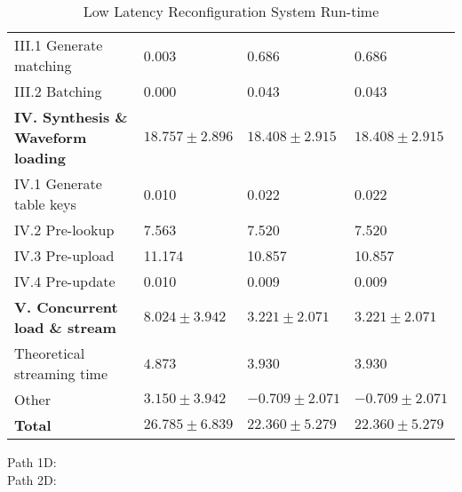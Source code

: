 \documentclass{article}
\begin{document}
\begin{table}
\begin{tabular}{|l|p{35mm}|p{35mm}|p{35mm}|}
            \hline
            \hspace{3mm} \small III.1 Generate matching&\small0.003  &\small0.686 &\small0.686 \\ 
            \hspace{3mm} \small III.2 Batching &\small0.000 &\small0.043&\small0.043\\ 
            \hline
            \textbf{IV. Synthesis \& Waveform loading} &$18.757\pm2.896$ & $ 18.408\pm2.915$ & $ 18.408\pm2.915$ \\ 
            \hline
            \hspace{3mm} \small IV.1 Generate table keys &\small0.010 &\small0.022&\small0.022\\ 
            \hspace{3mm} \small IV.2 Pre-lookup &\small7.563 &\small7.520&\small7.520\\ 
            \hspace{3mm} \small IV.3 Pre-upload &\small11.174 &\small10.857&\small10.857\\ 
            \hspace{3mm} \small IV.4 Pre-update &\small0.010 &\small0.009&\small0.009\\ 
            \hline
            \textbf{V. Concurrent load \& stream} &$8.024\pm3.942$ & $3.221\pm2.071$ & $3.221\pm2.071$ \\ 
            \hline
            \hspace{3mm} \small Theoretical streaming time &\small$4.873$ &\small$3.930$&\small$3.930$\\ 
            \hspace{3mm} \small Other &\small$3.150\pm3.942$ &\small$-0.709\pm2.071$&\small$-0.709\pm2.071$\\ 
            \hline
            \textbf{Total} & $26.785\pm6.839$ & $22.360\pm5.279$ & $22.360\pm5.279$ \\ 
            \hline
            \hline
        \end{tabular}
    \caption{Low Latency Reconfiguration System Run-time}
\end{table}

\hspace{0mm}Path 1D:  \\

\hspace{0mm}Path 2D: 
\end{document}
